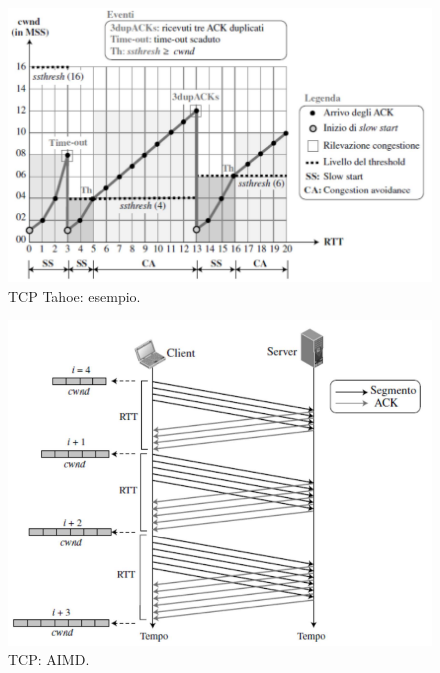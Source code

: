 \documentclass[11pt, italian, openany]{book}
\begin{document}
\begin{sloppypar}
\begin{figure}[!h]
	\centering
	\includegraphics[scale=0.35]{images/tcp-tahoe-esempio.png}
	\caption{TCP Tahoe: esempio.}
	\label{fig:tcp-tahoe-esempio}
\end{figure}

\pagebreak

\begin{figure}[!h]
	\centering
	\includegraphics[scale=0.45]{images/tcp-aimd.png}
	\caption{TCP: AIMD.}
	\label{fig:tcp-aimd}
\end{figure}


\end{sloppypar}
\end{document}
